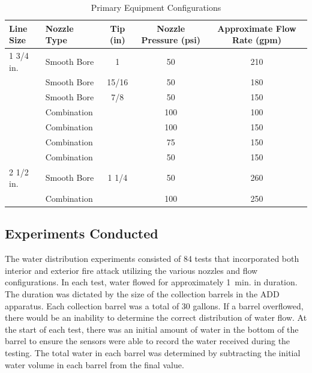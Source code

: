 \documentclass{article}
\begin{document}
\begin{table}[!ht]
\centering
\caption{Primary Equipment Configurations}
\label{tab:nozzles_used_detail}
\begin{tabular}{llccc}
\toprule[1.5pt]
Line Size & Nozzle Type & Tip (in) & Nozzle Pressure (psi) & Approximate Flow Rate (gpm) \\ 
\midrule
1 3/4 in. & Smooth Bore          & 1      & 50 & 210 \\
          & Smooth Bore          & 15/16  & 50 & 180 \\
          & Smooth Bore          & 7/8    & 50 & 150 \\
          & Combination          &        & 100 & 100 \\
          & Combination          &        & 100 & 150 \\
          & Combination          &        & 75 & 150 \\
          & Combination          &        & 50 & 150 \\ \midrule
2 1/2 in. & Smooth Bore          & 1 1/4  & 50 & 260 \\
          & Combination          &        & 100 & 250 \\
\bottomrule[1.25pt]
\end{tabular}
\end{table}

\subsection{Experiments Conducted}

The water distribution experiments consisted of 84 tests that incorporated both interior and exterior fire attack utilizing the various nozzles and flow configurations. In each test, water flowed for approximately 1~min. in duration. The duration was dictated by the size of the collection barrels in the ADD apparatus. Each collection barrel was a total of 30 gallons. If a barrel overflowed, there would be an inability to determine the correct distribution of water flow. At the start of each test, there was an initial amount of water in the bottom of the barrel to ensure the sensors were able to record the water received during the testing. The total water in each barrel was determined by subtracting the initial water volume in each barrel from the final value. 
\end{document}

